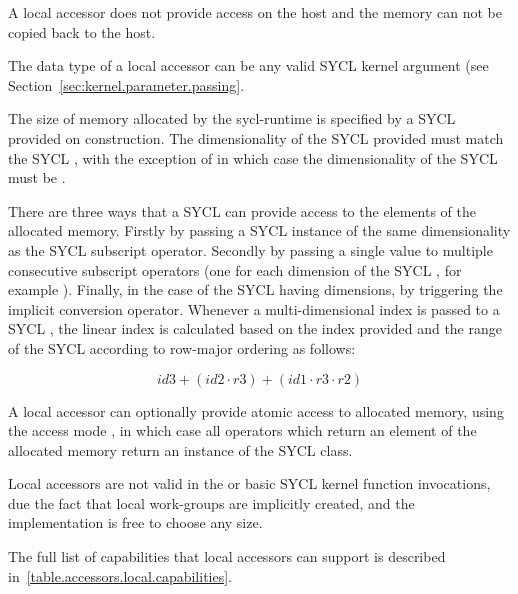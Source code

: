 A local accessor does not provide access on the \gls{host} and the
memory can not be copied back to the \gls{host}.

The data type of a local accessor can be any valid SYCL kernel argument (see
Section~\ref{sec:kernel.parameter.passing}.

The size of memory allocated by the \gls{sycl-runtime} is specified by a SYCL
 provided on construction. The dimensionality of the SYCL
 provided must match the SYCL , with the
exception of  in which case the dimensionality of the SYCL
 must be .

There are three ways that a SYCL  can provide access to the
elements of the allocated memory. Firstly by passing a SYCL  instance of the same dimensionality as the SYCL 
subscript operator. Secondly by passing a single  value to
multiple consecutive subscript operators (one for each dimension of the SYCL
, for example ). Finally, in the
case of the SYCL  having  dimensions, by
triggering the implicit conversion operator. Whenever a multi-dimensional index
is passed to a SYCL , the linear index is calculated based
on the index  provided and the range of the SYCL 
  according to row-major
ordering as follows:

\begin{equation}
\label{row-major-equation-local}
 id3 + (id2 \cdot r3) + (id1 \cdot r3 \cdot r2)
\end{equation}

A local accessor can optionally provide atomic access to allocated memory,
using the access mode , in which case all
operators which return an element of the allocated memory return an instance of
the SYCL  class.

Local accessors are not valid in the  or basic 
 SYCL kernel function invocations, due the fact that
local \glspl{work-group} are implicitly created, and the implementation is free
to choose any size.

The full list of capabilities that local accessors can support is described
in~\ref{table.accessors.local.capabilities}.


